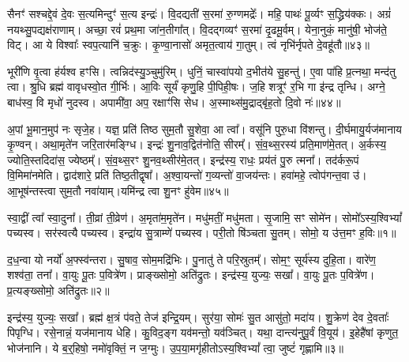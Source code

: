 सैनꣳ॑ सश्चद्दे॒वं दे॒वः स॒त्यमिन्दुꣳ॑ स॒त्य इन्द्रः॑।
वि॒दद्यती॑ स॒रमा॑ रु॒ग्णमद्रेः᳚।
महि॒ पाथः॑ पू॒र्व्यꣳ स॒द्ध्रिय॑क्कः।
अग्रं॑ नयथ्सु॒पद्यक्ष॑राणाम्।
अच्छा॒ रवं॑ प्रथ॒मा जा॑न॒तीगा᳚त्।
वि॒दद्गव्यꣳ॑ स॒रमा॑ दृ॒ढमू॒र्वम्।
येना॒नुकं॒ मानु॑षी॒ भोज॑ते॒ विट्।
आ ये विश्वाः᳚ स्वप॒त्यानि॑ च॒क्रुः।
कृ॒ण्वा॒नासो॑ अमृत॒त्वाय॑ गा॒तुम्।
त्वं नृभि॑र्नृपते दे॒वहू॑तौ॥४३॥\ip

भूरी॑णि वृ॒त्वा ह॑र्यश्व हꣳसि।
त्वन्निद॑स्यु॒ञ्चुमु॑रिम्।
धुनिं॒ चा\-स्वा॑\-पयो द॒भीत॑ये सु॒हन्तु॑।
ए॒वा पा॑हि प्र॒त्नथा॒ मन्द॑तु त्वा।
श्रु॒धि ब्रह्म॑ वावृधस्वो॒त गी॒र्भिः।
आ॒विः सूर्यं॑ कृणु॒हि पी॒पिही॒षः।
ज॒हि शत्रूꣳ॑ र॒भि गा इ॑न्द्र तृन्धि।
अग्ने॒ बाध॑स्व॒ वि मृधो॑ नुदस्व।
अपामी॑वा॒ अप॒ रक्षाꣳ॑सि सेध।
अ॒स्माथ्स॑मु॒द्राद्बृ॑ह॒तो दि॒वो नः॑॥४४॥\ip

अ॒पां भू॒मान॒मुप॑ नः सृजे॒ह।
यज्ञ॒ प्रति॑ तिष्ठ सुम॒तौ सु॒शेवा॒ आ त्वा᳚।
वसू॑नि पुरु॒धा वि॑शन्तु।
दी॒र्घमायु॒र्यज॑मानाय कृ॒ण्वन्।
अथा॒मृते॑न जरि॒तार॑मङ्ग्धि।
इन्द्रः॑ शु॒नाव॒द्वित॑नोति॒ सीरम्᳚।
सं॒व॒थ्स॒रस्य॑ प्रति॒माण॑मे॒तत्।
अ॒र्कस्य॒ ज्योति॒स्तदिदा॑स॒ ज्येष्ठम्᳚।
सं॒व॒थ्स॒रꣳ शु॒नव॒थ्सीर॑मे॒तत्।
इन्द्र॑स्य॒ राधः॒ प्रय॑तं पु॒रु त्मना᳚।
तद॑र्करू॒पं वि॒मिमा॑नमेति।
द्वाद॑शारे॒ प्रति॑ तिष्ठ॒तीद्वृषा᳚।
अ॒श्वा॒यन्तो॑ ग॒व्यन्तो॑ वा॒जय॑न्तः।
हवा॑महे॒ त्वोप॑गन्त॒वा उ॑।
आ॒भूष॑न्तस्त्वा सुम॒तौ नवा॑याम्।यमि॑न्द्र त्वा शु॒नꣳ हु॑वेम॥४५॥\ip{}


\clearpage
{}
\setcounter{anuvakam}{0}

स्वा॒द्वीं त्वा᳚ स्वा॒दुना᳚।
ती॒व्रां ती॒व्रेण॑।
अ॒मृता॑म॒मृते॑न।
मधु॑मतीं॒ मधु॑मता।
सृ॒जामि॒ सꣳ सोमे॑न।
सोमो᳚\-ऽस्य॒श्विभ्यां᳚ पच्यस्व।
सर॑स्वत्यै पच्यस्व।
इन्द्रा॑य सु॒त्राम्णे॑ पच्यस्व।
परी॒तो षि॑ञ्चता सु॒तम्।
सोमो॒ य उ॑त्त॒मꣳ ह॒विः॥१॥\ip

द॒ध॒न्वा यो नर्यो॑ अ॒फ्स्व॑न्तरा।
सु॒षाव॒ सोम॒मद्रि॑भिः।
पु॒नातु॑ ते परि॒स्रुतम्᳚।
सोम॒ꣳ॒ सूर्य॑स्य दुहि॒ता।
वारे॑ण॒ शश्व॑ता॒ तना᳚।
वा॒युः पू॒तः प॒वित्रे॑ण।
प्राङ्ख्सोमो॒ अति॑द्रुतः।
इन्द्र॑स्य॒ युज्यः॒ सखा᳚।
वा॒युः पू॒तः प॒वित्रे॑ण।
प्र॒त्यङ्ख्सोमो॒ अति॑द्रुतः॥२॥\ip

इन्द्र॑स्य॒ युज्यः॒ सखा᳚।
ब्रह्म॑ क्ष॒त्रं प॑वते॒ तेज॑ इन्द्रि॒यम्।
सुर॑या॒ सोमः॑ सु॒त आसु॑तो॒ मदा॑य।
शु॒क्रेण॑ देव दे॒वताः᳚ पिपृग्धि।
रसे॒नान्नं॒ यज॑मानाय धेहि।
कु॒विद॒ङ्ग यव॑मन्तो॒ यव॑ञ्चित्।
यथा॒ दान्त्य॑नुपू॒र्वं वि॒यूय॑।
इ॒हेहै॑षां कृणुत॒ भोज॑नानि।
ये ब॒र्‌॒\mbox{}हिषो॒ नमो॑वृक्तिं॒ न ज॒ग्मुः।
उ॒प॒या॒मगृ॑हीतो\-ऽस्य॒श्विभ्यां᳚ त्वा॒ जुष्टं॑ गृह्णामि॥३॥\ip

